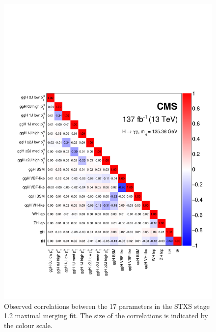 \begin{figure}[htb!]
  \centering
  \includegraphics[width=.75\textwidth]{Figures/hgg_results/stage1p2_maximal_correlations.pdf}
  \vspace{-.5cm}
  \caption[Correlations in the STXS stage 1.2 maximal merging parameters]
  {
    Observed correlations between the 17 parameters in the STXS stage 1.2 maximal merging fit. The size of the correlations is indicated by the colour scale.
  }
  \label{fig:stage1p2_maximal_correlations}
\end{figure}

